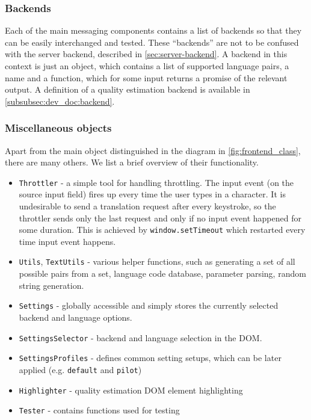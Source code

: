 \subsubsection*{Backends} \label{subsubsec:impl:backend}

Each of the main messaging components contains a list of backends so that they can be easily interchanged and tested. These ``backends'' are not to be confused with the server backend, described in \cref{sec:server-backend}. A backend in this context is just an object, which contains a list of supported language pairs, a name and a function, which for some input returns a promise of the relevant output. A definition of a quality estimation  backend is available in \cref{subsubsec:dev_doc:backend}.

\pagebreak
\subsubsection{Miscellaneous objects}

Apart from the main object distinguished in the diagram in \cref{fig:frontend_class}, there are many others. We list a brief overview of their functionality.

\begin{itemize}
    \item \texttt{Throttler} - a simple tool for handling throttling. The input event (on the source input field) fires up every time the user types in a character. It is undesirable to send a translation request after every keystroke, so the throttler sends only the last request and only if no input event happened for some duration. This is achieved by \texttt{window.setTimeout} which restarted every time input event happens.
    \item \texttt{Utils}, \texttt{TextUtils} - various helper functions, such as generating a set of all possible pairs from a set, language code database, parameter parsing, random string generation.
    \item \texttt{Settings} - globally accessible and simply stores the currently selected backend and language options.
    \item \texttt{SettingsSelector} - backend and language selection in the DOM.
    \item \texttt{SettingsProfiles} - defines common setting setups, which can be later applied (e.g. \texttt{default} and \texttt{pilot})
    \item \texttt{Highlighter} - quality estimation DOM element highlighting
    \item \texttt{Tester} - contains functions used for testing
\end{itemize}

